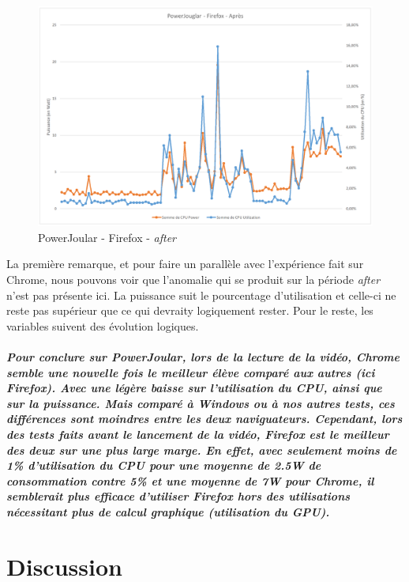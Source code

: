 \documentclass[12pt, a4paper]{report}
\begin{document}
\begin{figure}[H]
    \includegraphics[width=1\linewidth]{res//graph/PowerJoular/ff-after.png}
    \caption{PowerJoular - Firefox - \textit{after}}
    \label{fig:pj_ff_after}
\end{figure}
La première remarque, et pour faire un parallèle avec l'expérience fait sur Chrome, nous pouvons voir que l'anomalie qui se produit sur la période \textit{after} n'est pas présente ici. La puissance suit le pourcentage d'utilisation et celle-ci ne reste pas supérieur que ce qui devraity logiquement rester. 
Pour le reste, les variables suivent des évolution logiques. 

\paragraph{Pour conclure sur PowerJoular, lors de la lecture de la vidéo, Chrome semble une nouvelle fois le meilleur élève comparé aux autres (ici Firefox). Avec une légère baisse sur l'utilisation du CPU, ainsi que sur la puissance. Mais comparé à Windows ou à nos autres tests, ces différences sont moindres entre les deux naviguateurs.
Cependant, lors des tests faits avant le lancement de la vidéo, Firefox est le meilleur des deux sur une plus large marge. En effet, avec seulement moins de 1\% d'utilisation du CPU pour une moyenne de 2.5W de consommation contre 5\% et une moyenne de 7W pour Chrome, il semblerait plus efficace d'utiliser Firefox hors des utilisations nécessitant plus de calcul graphique (utilisation du GPU). }

\chapter{\centering Discussion}
\end{document}
